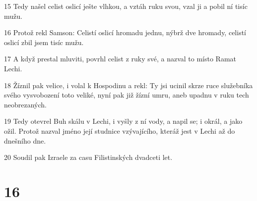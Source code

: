 \par 15 Tedy našel celist oslicí ješte vlhkou, a vztáh ruku svou, vzal ji a pobil ní tisíc mužu.
\par 16 Protož rekl Samson: Celistí oslicí hromadu jednu, nýbrž dve hromady, celistí oslicí zbil jsem tisíc mužu.
\par 17 A když prestal mluviti, povrhl celist z ruky své, a nazval to místo Ramat Lechi.
\par 18 Žíznil pak velice, i volal k Hospodinu a rekl: Ty jsi ucinil skrze ruce služebníka svého vysvobození toto veliké, nyní pak již žízní umru, aneb upadnu v ruku tech neobrezaných.
\par 19 Tedy otevrel Buh skálu v Lechi, i vyšly z ní vody, a napil se; i okrál, a jako ožil. Protož nazval jméno její studnice vzývajícího, kteráž jest v Lechi až do dnešního dne.
\par 20 Soudil pak Izraele za casu Filistinských dvadceti let.

\chapter{16}

